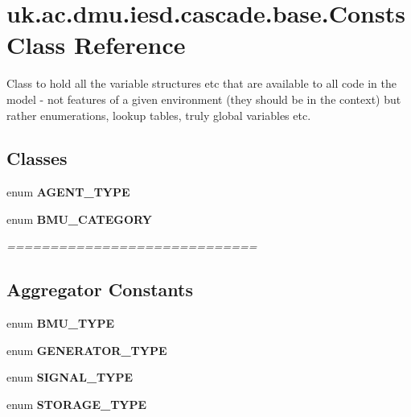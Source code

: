 \hypertarget{classuk_1_1ac_1_1dmu_1_1iesd_1_1cascade_1_1base_1_1_consts}{\section{uk.\-ac.\-dmu.\-iesd.\-cascade.\-base.\-Consts Class Reference}
\label{classuk_1_1ac_1_1dmu_1_1iesd_1_1cascade_1_1base_1_1_consts}
}


Class to hold all the variable structures etc that are available to all code in the model -\/ not features of a given environment (they should be in the context) but rather enumerations, lookup tables, truly global variables etc.  


\subsection*{Classes}
\begin{DoxyCompactItemize}
\item 
enum {\bfseries A\-G\-E\-N\-T\-\_\-\-T\-Y\-P\-E}
\item 
enum {\bfseries B\-M\-U\-\_\-\-C\-A\-T\-E\-G\-O\-R\-Y}
\begin{DoxyCompactList}\small\item\em ============================= \subsection*{Aggregator Constants }\end{DoxyCompactList}\item 
enum {\bfseries B\-M\-U\-\_\-\-T\-Y\-P\-E}
\item 
enum {\bfseries G\-E\-N\-E\-R\-A\-T\-O\-R\-\_\-\-T\-Y\-P\-E}
\item 
enum {\bfseries S\-I\-G\-N\-A\-L\-\_\-\-T\-Y\-P\-E}
\item 
enum {\bfseries S\-T\-O\-R\-A\-G\-E\-\_\-\-T\-Y\-P\-E}
\end{DoxyCompactItemize}
